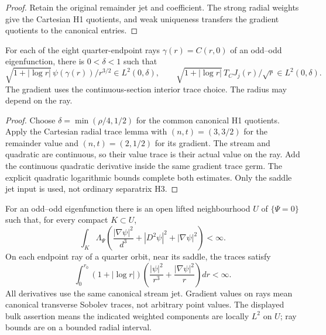 \begin{proof}
\leanok
Retain the original remainder jet and coefficient.
The strong radial weights give the Cartesian H1 quotients, and weak
uniqueness transfers the gradient quotients to the canonical entries.
\end{proof}

\begin{lemma}
\label{lem:dd-log-ray-bounds}
\leanok
For each of the eight quarter-endpoint rays $\gamma(r)=C(r,0)$ of an
odd--odd eigenfunction, there is $0<\delta<1$ such that
\[
 \sqrt{1+|\log r|}\,\psi(\gamma(r))/r^{3/2}\in L^2(0,\delta),\qquad
 \sqrt{1+|\log r|}\,T_C J_j(r)/\sqrt r\in L^2(0,\delta).
\]
The gradient uses the continuous-section interior trace choice.
The radius may depend on the ray.
\end{lemma}

\begin{proof}
\leanok
Choose $\delta=\min(\rho/4,1/2)$ for the common canonical H1 quotients.
Apply the Cartesian radial trace lemma with $(n,t)=(3,3/2)$ for the
remainder value and $(n,t)=(2,1/2)$ for its gradient.
The stream and quadratic are continuous, so their value trace is their
actual value on the ray. Add the continuous quadratic derivative inside
the same gradient trace germ.
The explicit quadratic logarithmic bounds complete both estimates.
Only the saddle jet input is used, not ordinary separatrix H3.
\end{proof}

\begin{lemma}
\label{lem:dd-log-forcing}
\leanok
For an odd--odd eigenfunction there is an open lifted neighbourhood $U$ of
$\{\Psi=0\}$ such that, for every compact $K\subset U$,
\[
 \int_K\Lambda_\Psi\left(
       \frac{|\nabla\psi|^2}{d^3}+|D^2\psi|^2+|\nabla\psi|^2\right)<\infty.
\]
On each endpoint ray of a quarter orbit, near its saddle, the traces satisfy
\[
 \int_0^{r_0}(1+|\log r|)\left(
          \frac{|\psi|^2}{r^3}+\frac{|\nabla\psi|^2}{r}\right)dr<\infty.
\]
All derivatives use the same canonical stream jet. Gradient values on rays
mean canonical transverse Sobolev traces, not arbitrary point values.
The displayed bulk assertion means the indicated weighted components are
locally $L^2$ on $U$; ray bounds are on a bounded radial interval.
\end{lemma}

